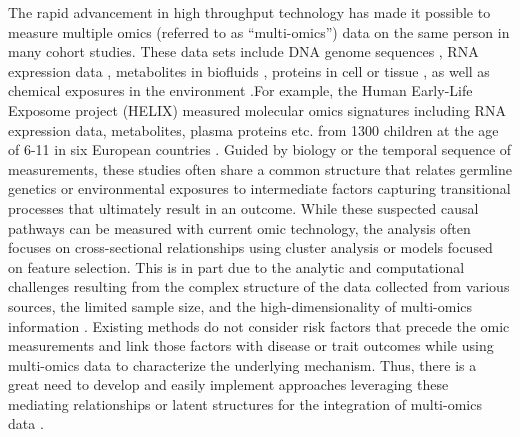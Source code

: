 The rapid advancement in high throughput technology has made it possible
to measure multiple omics (referred to as ``multi-omics'') data on the
same person in many cohort studies. These data sets include DNA genome
sequences \citep{goodwin2016coming}, RNA expression data \citep{ozsolak2011rna},
metabolites in biofluids \citep{beger2013review}, proteins in cell or tissue
\citep{aslam2017proteomics}, as well as chemical exposures in the environment
\citep{wild2005complementing}.For example, the Human Early-Life Exposome
project (HELIX) measured molecular omics signatures including RNA
expression data, metabolites, plasma proteins etc. from 1300 children at
the age of 6-11 in six European countries \citep{vrijheid2014human}. Guided
by biology or the temporal sequence of measurements, these studies often
share a common structure that relates germline genetics or environmental
exposures to intermediate factors capturing transitional processes that
ultimately result in an outcome. While these suspected causal pathways
can be measured with current omic technology, the analysis often focuses
on cross-sectional relationships using cluster analysis or models
focused on feature selection. This is in part due to the analytic and
computational challenges resulting from the complex structure of the
data collected from various sources, the limited sample size, and the
high-dimensionality of multi-omics information \citep{tini2019multi}.
Existing methods do not consider risk factors that precede the omic
measurements and link those factors with disease or trait outcomes while
using multi-omics data to characterize the underlying mechanism. Thus,
there is a great need to develop and easily implement approaches
leveraging these mediating relationships or latent structures for the
integration of multi-omics data \citep{subramanian2020multi}.

